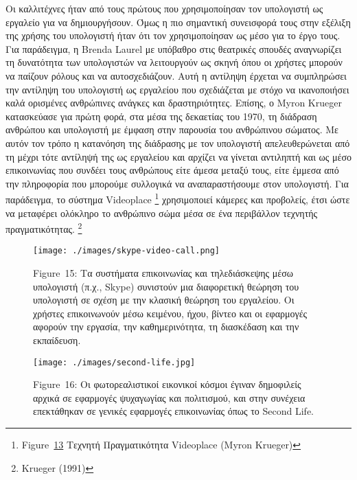\documentclass[
]{article}
\begin{document}
Οι καλλιτέχνες ήταν από τους πρώτους που χρησιμοποίησαν τον υπολογιστή
ως εργαλείο για να δημιουργήσουν. Όμως η πιο σημαντική συνεισφορά τους
στην εξέλιξη της χρήσης του υπολογιστή ήταν ότι τον χρησιμοποίησαν ως
μέσο για το έργο τους. Για παράδειγμα, η Brenda Laurel με υπόβαθρο στις
θεατρικές σπουδές αναγνωρίζει τη δυνατότητα των υπολογιστών να
λειτουργούν ως σκηνή όπου οι χρήστες μπορούν να παίζουν ρόλους και να
αυτοσχεδιάζουν. Αυτή η αντίληψη έρχεται να συμπληρώσει την αντίληψη του
υπολογιστή ως εργαλείου που σχεδιάζεται με στόχο να ικανοποιήσει καλά
ορισμένες ανθρώπινες ανάγκες και δραστηριότητες. Επίσης, ο Myron Krueger
κατασκεύασε για πρώτη φορά, στα μέσα της δεκαετίας του 1970, τη διάδραση
ανθρώπου και υπολογιστή με έμφαση στην παρουσία του ανθρώπινου σώματος.
Με αυτόν τον τρόπο η κατανόηση της διάδρασης με τον υπολογιστή
απελευθερώνεται από τη μέχρι τότε αντίληψή της ως εργαλείου και αρχίζει
να γίνεται αντιληπτή και ως μέσο επικοινωνίας που συνδέει τους ανθρώπους
είτε άμεσα μεταξύ τους, είτε έμμεσα από την πληροφορία που μπορούμε
συλλογικά να αναπαραστήσουμε στον υπολογιστή. Για παράδειγμα, το σύστημα
Videoplace \footnote{Figure~\protect\hyperlink{fig:videoplace}{13}
  Τεχνητή Πραγματικότητα Videoplace (Myron Krueger)} χρησιμοποιεί
κάμερες και προβολείς, έτσι ώστε να μεταφέρει ολόκληρο το ανθρώπινο σώμα
μέσα σε ένα περιβάλλον τεχνητής πραγματικότητας. \footnote{Krueger
  (1991)}

\leavevmode{}%
\begin{figure}
\hypertarget{fig:skype-video-call}{%
\centering
\texttt{[image: ./images/skype-video-call.png]}
\caption{Figure~15: Τα συστήματα επικοινωνίας και τηλεδιάσκεψης μέσω
υπολογιστή (π.χ., Skype) συνιστούν μια διαφορετική θεώρηση του
υπολογιστή σε σχέση με την κλασική θεώρηση του εργαλείου. Οι χρήστες
επικοινωνούν μέσω κειμένου, ήχου, βίντεο και οι εφαρμογές αφορούν την
εργασία, την καθημερινότητα, τη διασκέδαση και την
εκπαίδευση.}\label{fig:skype-video-call}
}
\end{figure}

\leavevmode{}%
\begin{figure}
\hypertarget{fig:second-life}{%
\centering
\texttt{[image: ./images/second-life.jpg]}
\caption{Figure~16: Οι φωτορεαλιστικοί εικονικοί κόσμοι έγιναν
δημοφιλείς αρχικά σε εφαρμογές ψυχαγωγίας και πολιτισμού, και στην
συνέχεια επεκτάθηκαν σε γενικές εφαρμογές επικοινωνίας όπως το Second
Life.}\label{fig:second-life}
}
\end{figure}
\end{document}
